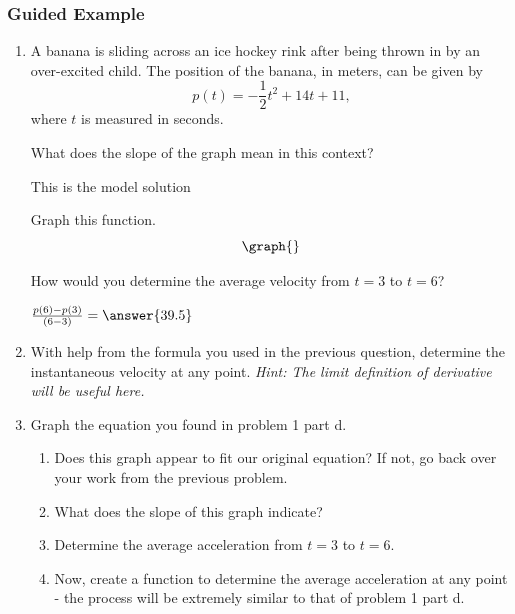 \documentclass{ximera}
\begin{document}
\subsubsection{Guided Example}
\begin{enumerate}
\item {A banana is sliding across an ice hockey rink after being thrown in by an over-excited child. The position of the banana, in meters, can be given by $$p(t) = -\dfrac{1}{2}t^2+14t+11\text{,}$$ where $t$ is measured in seconds.}

\begin{question}
What does the slope of the graph mean in this context?
\begin{freeResponse}
This is the model solution %
\end{freeResponse}
\end{question}

\begin{question}
Graph this function.
\[
    \graph{}
\]
\end{question}

\begin{question}
How would you determine the average velocity from $t = 3$ to $t = 6$?

$ \frac{p(6)-p(3)}{(6-3)}  =  \answer{39.5}$
\end{question}

\item{With help from the formula you used in the previous question, determine the instantaneous velocity at any point. \textit{Hint: The limit definition of derivative will be useful here.}}

\item{Graph the equation you found in problem 1 part d.}
\begin{enumerate}
\item{Does this graph appear to fit our original equation? If not, go back over your work from the previous problem.}
\item{What does the slope of this graph indicate?}
\item{Determine the average acceleration from $t = 3$ to $t = 6$.}
\item{Now, create a function to determine the average acceleration at any point - the process will be extremely similar to that of problem 1 part d.}
\end{enumerate}
\end{enumerate}
\end{document}
